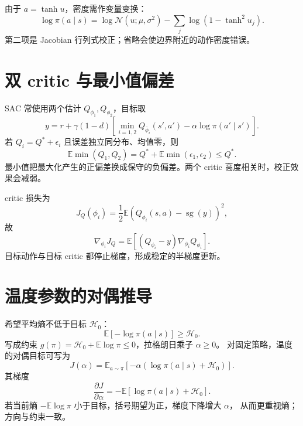 \documentclass[11pt]{article}
\numberwithin{equation}{section}
\newcommand{\E}{\mathbb{E}}
\newcommand{\1}{\mathbf{1}}
\newcommand{\cN}{\mathcal{N}}
\begin{document}
由于 $a=\tanh u$，密度需作变量变换：
\begin{equation}
 \log\pi(a\mid s)=\log\cN(u;\mu,\sigma^2)
 -\sum_j\log(1-\tanh^2u_j).
\end{equation}
第二项是 Jacobian 行列式校正；省略会使边界附近的动作密度错误。

\section{双 critic 与最小值偏差}

SAC 常使用两个估计 $Q_{\phi_1},Q_{\phi_2}$，目标取
\begin{equation}
 y=r+\gamma(1-d)
 \left[\min_{i=1,2}Q_{\bar\phi_i}(s',a')
 -\alpha\log\pi(a'\mid s')\right].
\end{equation}
若 $Q_i=Q^*+\epsilon_i$ 且误差独立同分布、均值零，则
\begin{equation}
 \E\min(Q_1,Q_2)=Q^*+\E\min(\epsilon_1,\epsilon_2)\le Q^*.
\end{equation}
最小值把最大化产生的正偏差换成保守的负偏差。两个 critic 高度相关时，校正效果会减弱。

critic 损失为
\begin{equation}
 J_Q(\phi_i)=\frac12\E(Q_{\phi_i}(s,a)-\operatorname{sg}(y))^2,
\end{equation}
故
\begin{equation}
 \nabla_{\phi_i}J_Q
 =\E[(Q_{\phi_i}-y)\nabla_{\phi_i}Q_{\phi_i}].
\end{equation}
目标动作与目标 critic 都停止梯度，形成稳定的半梯度更新。

\section{温度参数的对偶推导}

希望平均熵不低于目标 $\mathcal H_0$：
\begin{equation}
 \E[-\log\pi(a\mid s)]\ge\mathcal H_0.
\end{equation}
写成约束
$g(\pi)=\mathcal H_0+\E\log\pi\le0$，拉格朗日乘子 $\alpha\ge0$。
对固定策略，温度的对偶目标可写为
\begin{equation}
 J(\alpha)=\E_{a\sim\pi}
 [-\alpha(\log\pi(a\mid s)+\mathcal H_0)].
\end{equation}
其梯度
\begin{equation}
 \frac{\partial J}{\partial\alpha}
 =-\E[\log\pi(a\mid s)+\mathcal H_0].
\end{equation}
若当前熵 $-\E\log\pi$ 小于目标，括号期望为正，梯度下降增大 $\alpha$，
从而更重视熵；方向与约束一致。
\end{document}
